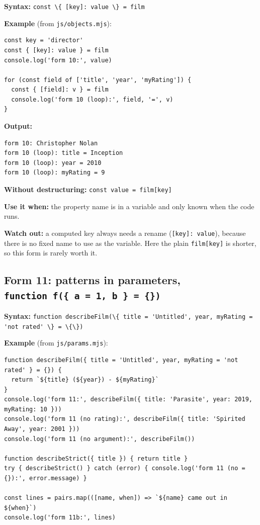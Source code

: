 \documentclass[
]{article}
\newcommand{\passthrough}[1]{#1}
\begin{document}
\textbf{Syntax:}
\passthrough{\lstinline!const \{ [key]: value \} = film!}

\textbf{Example} (from \passthrough{\lstinline!js/objects.mjs!}):

\begin{lstlisting}
const key = 'director'
const { [key]: value } = film
console.log('form 10:', value)

for (const field of ['title', 'year', 'myRating']) {
  const { [field]: v } = film
  console.log('form 10 (loop):', field, '=', v)
}
\end{lstlisting}

\textbf{Output:}

\begin{lstlisting}
form 10: Christopher Nolan
form 10 (loop): title = Inception
form 10 (loop): year = 2010
form 10 (loop): myRating = 9
\end{lstlisting}

\textbf{Without destructuring:}
\passthrough{\lstinline!const value = film[key]!}

\textbf{Use it when:} the property name is in a variable and only known
when the code runs.

\textbf{Watch out:} a computed key always needs a rename
(\passthrough{\lstinline![key]: value!}), because there is no fixed name
to use as the variable. Here the plain
\passthrough{\lstinline!film[key]!} is shorter, so this form is rarely
worth it.

\hypertarget{form-11-patterns-in-parameters-function-f-a-1-b}{%
\subsection{\texorpdfstring{Form 11: patterns in parameters,
\texttt{function\ f(\{\ a\ =\ 1,\ b\ \}\ =\ \{\})}}{Form 11: patterns in parameters, function f(\{ a = 1, b \} = \{\})}}\label{form-11-patterns-in-parameters-function-f-a-1-b}}

\textbf{Syntax:}
\passthrough{\lstinline!function describeFilm(\{ title = 'Untitled', year, myRating = 'not rated' \} = \{\})!}

\textbf{Example} (from \passthrough{\lstinline!js/params.mjs!}):

\begin{lstlisting}
function describeFilm({ title = 'Untitled', year, myRating = 'not rated' } = {}) {
  return `${title} (${year}) - ${myRating}`
}
console.log('form 11:', describeFilm({ title: 'Parasite', year: 2019, myRating: 10 }))
console.log('form 11 (no rating):', describeFilm({ title: 'Spirited Away', year: 2001 }))
console.log('form 11 (no argument):', describeFilm())

function describeStrict({ title }) { return title }
try { describeStrict() } catch (error) { console.log('form 11 (no = {}):', error.message) }

const lines = pairs.map(([name, when]) => `${name} came out in ${when}`)
console.log('form 11b:', lines)
\end{lstlisting}
\end{document}
